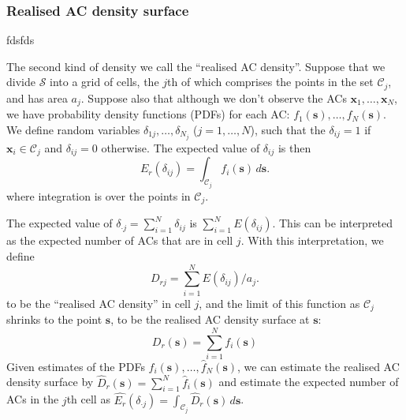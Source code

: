 \documentclass[useAMS,usenatbib,referee]{biom}
\begin{document}
\subsubsection{Realised AC density surface} \label{s:racd}
fdsfds

 
The second kind of density we call the ``realised AC density''. Suppose that we divide $\mathcal{S}$ into a grid of cells, the $j$th of which comprises the points in the set $\mathcal{C}_j$, and has area $a_j$. Suppose also that although we don't observe the ACs $\bm{x}_1,\ldots,\bm{x}_N$, we  have probability density functions (PDFs) for each AC: $f_1(\bm{s}),\ldots,f_N(\bm{s})$. We define random variables $\delta_{1j},\ldots,\delta_{N_j}$ ($j=1,\ldots,N$), such that the $\delta_{ij}=1$ if $\bm{x}_i\in\mathcal{C}_j$ and $\delta_{ij}=0$ otherwise. The expected value of $\delta_{ij}$ is then 
\begin{equation}
E_r(\delta_{ij})=\int_{\mathcal{C}_j} f_i(\bm{s}) \, d\bm{s}. \label{eq:realised-p_ij}
\end{equation}
\noindent
where integration is over the points in $\mathcal{C}_j$.

The expected value of $\delta_{\cdot j}=\sum_{i=1}^N\delta_{ij}$ is $\sum_{i=1}^N E(\delta_{ij})$. This can be interpreted as the expected number of ACs that are in cell $j$. With this interpretation, we define 
\begin{equation}
  D_{rj} = \sum_{i = 1}^N E(\delta_{ij})/a_j. \label{eq:realised-D_rj}
\end{equation}
\noindent 
to be the ``realised AC density'' in cell $j$, and the limit of this function as $\mathcal{C}_j$ shrinks to the point $\bm{s}$, to be the realised AC density surface at $\bm{s}$:
\begin{equation}
D_r(\bm{s})=\sum_{i=1}^N f_i(\bm{s}) \label{eq:realised-D}
\end{equation}
\noindent
Given estimates of the PDFs $\hat{f}_i(\bm{s}),\ldots,\hat{f}_N(\bm{s})$, we can estimate the realised AC density surface by $\hat{D}_r(\bm{s})=\sum_{i = 1}^N\hat{f}_i(\bm{s})$ and estimate the expected number of ACs in the $j$th cell as $\hat{E_r}(\delta_{\cdot j})=\int_{\mathcal{C}_j}\hat{D}_r(\bm{s}) \, d\bm{s}$.
\end{document}
